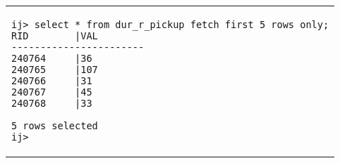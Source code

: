 \begin{tabular}{p{}}
\begin{verbatim}
ij> select * from dur_r_pickup fetch first 5 rows only;
RID        |VAL
-----------------------
240764     |36
240765     |107
240766     |31
240767     |45
240768     |33

5 rows selected
ij>
\end{verbatim}\\
\end{tabular}
